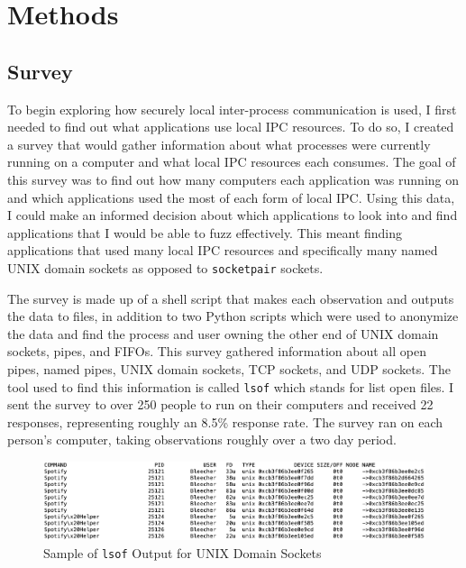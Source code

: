 \chapter{Methods}
\label{sec:methods}

\section{Survey}
\label{sec:survey}
To begin exploring how securely local inter-process communication is used, I first needed to find out what applications use local IPC resources.  To do so, I created a survey that would gather information about what processes were currently running on a computer and what local IPC resources each consumes.  The goal of this survey was to find out how many computers each application was running on and which applications used the most of each form of local IPC.  Using this data, I could make an informed decision about which applications to look into and find applications that I would be able to fuzz effectively.  This meant finding applications that used many local IPC resources and specifically many named UNIX domain sockets as opposed to \texttt{socketpair} sockets.

The survey is made up of a shell script that makes each observation and outputs the data to files, in addition to two Python scripts which were used to anonymize the data and find the process and user owning the other end of UNIX domain sockets, pipes, and FIFOs.  This survey gathered information about all open pipes, named pipes, UNIX domain sockets, TCP sockets, and UDP sockets.  The tool used to find this information is called \texttt{lsof} which stands for list open files.  I sent the survey to over 250 people to run on their computers and received 22 responses, representing roughly an 8.5\% response rate.  The survey ran on each person's computer, taking observations roughly over a two day period.  

\begin{figure}
\centering
\includegraphics[width=1\textwidth]{lsofOutput.png}
\caption{Sample of \texttt{lsof} Output for UNIX Domain Sockets}
\label{fig:lsofOutput}
\end{figure}

